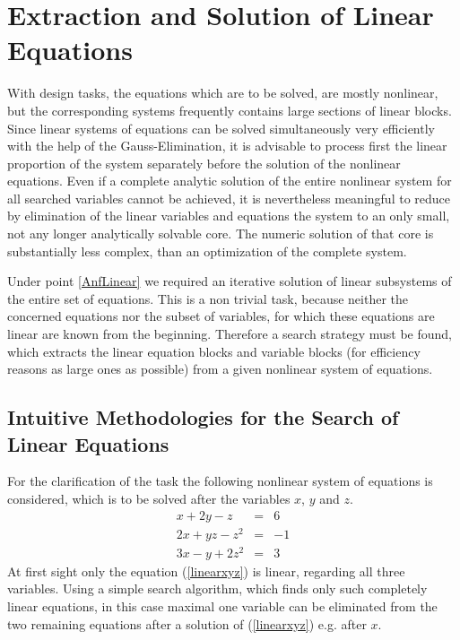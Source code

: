 \section{Extraction and Solution of Linear Equations}

With design tasks, the equations which are to be solved, are mostly nonlinear,  but the corresponding systems frequently contains  large sections of linear blocks. Since linear systems of equations can be solved simultaneously very efficiently with the help of the Gauss-Elimination, it is advisable to process first the linear proportion of the system separately before the solution of the nonlinear equations. Even if a complete analytic solution of the entire nonlinear system  for all searched variables cannot be achieved, it is nevertheless meaningful  to reduce by elimination of the linear variables and equations the system to an only small, not any longer analytically solvable core. The numeric solution of that core is substantially less complex, than an optimization of the complete system. 

Under point \ref{AnfLinear} we required an iterative solution  of linear subsystems of the entire set of equations. This is a non trivial task, because neither the  concerned equations  nor the subset of variables, for which these equations are linear are known from the beginning. Therefore a search strategy must be found, which extracts the linear equation blocks and variable blocks (for efficiency reasons as large ones as possible)  from a given nonlinear system of equations.

\subsection{\label{intuitive}Intuitive Methodologies for the Search of Linear Equations}

For the clarification of the task the following nonlinear system of equations is considered, which is to be solved after the variables $x$, $y$ and $z$.  
\begin{eqnarray}
 x + 2y -    z &=&  6 \label{linearxyz} \\
2x + yz -  z^2 &=& -1 \label{linearx}   \\
3x -  y + 2z^2 &=&  3 \label{linearxy}
\end{eqnarray}
At first sight only the equation (\ref{linearxyz}) is linear, regarding all three variables.  Using  a simple search algorithm, which finds only such completely linear equations, in this case maximal one variable can be eliminated from the two remaining equations after a solution of (\ref{linearxyz}) e.g. after $x$. 

